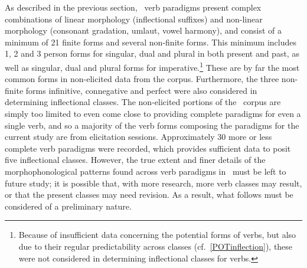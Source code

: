 As described in the previous section, \PS\ verb paradigms present complex combinations of linear morphology (inflectional suffixes) and non-linear morphology (consonant gradation, umlaut, vowel harmony), and consist of a minimum of 21 finite forms and several non-finite forms. This minimum includes 1, 2 and 3 person forms for singular, dual and plural in both present and past, as well as singular, dual and plural forms for imperative.\footnote{Because of insufficient data concerning the potential forms of verbs, but also due to their regular predictability across classes (cf.~\SEC\ref{POTinflection}), these were not considered in determining inflectional classes for verbs.} 
These are by far the most common forms in non-elicited data from the corpus. Furthermore, the three non-finite forms infinitive, connegative and perfect were also considered in determining inflectional classes. %
The non-elicited portions of the \PSDP\ corpus are simply too limited to even come close to providing complete paradigms for even a single verb, and so a majority of the verb forms composing the paradigms for the current study are from elicitation sessions. Approximately 30 more or less complete verb paradigms were recorded, which provides sufficient data to posit five inflectional classes. However, the true extent and finer details of the morphophonological patterns found across verb paradigms in \PS\ must be left to future study; it is possible that, with more research, more verb classes may result, or that the present classes may need revision. As a result, what follows must be considered of a preliminary nature. 



